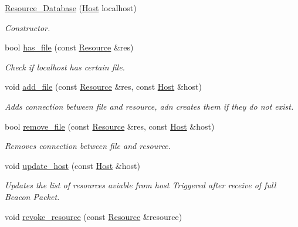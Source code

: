 \begin{DoxyCompactItemize}
\item 
\hyperlink{classsimpleP2P_1_1Resource__Database_a0158b1b1c4583d60534c2bea5dc437a3}{Resource\+\_\+\+Database} (\hyperlink{classsimpleP2P_1_1Host}{Host} localhost)
\begin{DoxyCompactList}\small\item\em Constructor. \end{DoxyCompactList}\item 
bool \hyperlink{classsimpleP2P_1_1Resource__Database_a2a6cd0b6da11176aec9ef7f218ac1c62}{has\+\_\+file} (const \hyperlink{classsimpleP2P_1_1Resource}{Resource} \&res)
\begin{DoxyCompactList}\small\item\em Check if localhost has certain file. \end{DoxyCompactList}\item 
void \hyperlink{classsimpleP2P_1_1Resource__Database_a7afdd297b15fb225b61f9d52e2ab9cc6}{add\+\_\+file} (const \hyperlink{classsimpleP2P_1_1Resource}{Resource} \&res, const \hyperlink{classsimpleP2P_1_1Host}{Host} \&host)
\begin{DoxyCompactList}\small\item\em Adds connection between file and resource, adn creates them if they do not exist. \end{DoxyCompactList}\item 
bool \hyperlink{classsimpleP2P_1_1Resource__Database_a9b0fe1012eba333db6d8e99b02764d4d}{remove\+\_\+file} (const \hyperlink{classsimpleP2P_1_1Resource}{Resource} \&res, const \hyperlink{classsimpleP2P_1_1Host}{Host} \&host)
\begin{DoxyCompactList}\small\item\em Removes connection between file and resource. \end{DoxyCompactList}\item 
void \hyperlink{classsimpleP2P_1_1Resource__Database_a181e862da4be11acbdb7d5569ad6925a}{update\+\_\+host} (const \hyperlink{classsimpleP2P_1_1Host}{Host} \&host)
\begin{DoxyCompactList}\small\item\em Updates the list of resources aviable from host Triggered after receive of full Beacon Packet. \end{DoxyCompactList}\item 
void \hyperlink{classsimpleP2P_1_1Resource__Database_a7ea91d496814c3d911b14ef4cd863943}{revoke\+\_\+resource} (const \hyperlink{classsimpleP2P_1_1Resource}{Resource} \&resource)

\end{DoxyCompactItemize}
